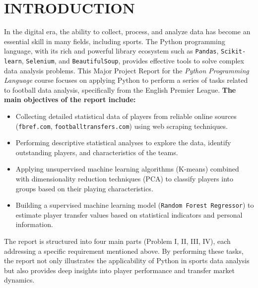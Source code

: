 \documentclass[12pt]{report}
\begin{document}
\chapter*{INTRODUCTION} %
{
\noindent
In the digital era, the ability to collect, process, and analyze data has become an essential skill in many fields, including sports. The Python programming language, with its rich and powerful library ecosystem such as \texttt{Pandas}, \texttt{Scikit-learn}, \texttt{Selenium}, and \texttt{BeautifulSoup}, provides effective tools to solve complex data analysis problems. This Major Project Report for the \textit{Python Programming Language} course focuses on applying Python to perform a series of tasks related to football data analysis, specifically from the English Premier League.
\vspace{1em}
\noindent
\textbf{The main objectives of the report include:} %
\begin{itemize}
  \item Collecting detailed statistical data of players from reliable online sources (\texttt{fbref.com}, \texttt{footballtransfers.com}) using web scraping techniques.
\item Performing descriptive statistical analyses to explore the data, identify outstanding players, and characteristics of the teams.
\item Applying unsupervised machine learning algorithms (K-means) combined with dimensionality reduction techniques (PCA) to classify players into groups based on their playing characteristics.
\item Building a supervised machine learning model (\texttt{Random Forest Regressor}) to estimate player transfer values based on statistical indicators and personal information.
\end{itemize}

\vspace{0.5em}
\noindent
The report is structured into four main parts (Problem I, II, III, IV), each addressing a specific requirement mentioned above. By performing these tasks, the report not only illustrates the applicability of Python in sports data analysis but also provides deep insights into player performance and transfer market dynamics.
}
\end{document}
